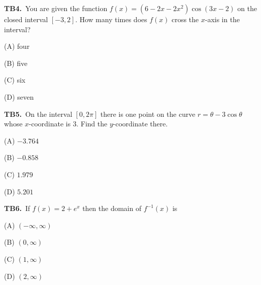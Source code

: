 \documentclass[11pt]{article}
\begin{document}
\bigskip\noindent\textbf{TB4.}\ You are given the function $f(x) = (6 - 2x - 2x^2)\cos(3x-2)$ on the closed interval $[-3,2]$. How many times does $f(x)$ cross the $x$-axis in the interval?
\begin{list}{}{\setlength{\leftmargin}{3em}\setlength{\labelwidth}{2.5em}\setlength{\itemsep}{0pt}\setlength{\topsep}{2pt}}
\item[(A)] four
\item[(B)] five
\item[(C)] six
\item[(D)] seven
\end{list}

\bigskip\noindent\textbf{TB5.}\ On the interval $[0,2\pi]$ there is one point on the curve $r = \theta - 3\cos\theta$ whose $x$-coordinate is $3$. Find the $y$-coordinate there.
\begin{list}{}{\setlength{\leftmargin}{3em}\setlength{\labelwidth}{2.5em}\setlength{\itemsep}{0pt}\setlength{\topsep}{2pt}}
\item[(A)] $-3.764$
\item[(B)] $-0.858$
\item[(C)] $1.979$
\item[(D)] $5.201$
\end{list}

\bigskip\noindent\textbf{TB6.}\ If $f(x) = 2 + e^x$ then the domain of $f^{-1}(x)$ is
\begin{list}{}{\setlength{\leftmargin}{3em}\setlength{\labelwidth}{2.5em}\setlength{\itemsep}{0pt}\setlength{\topsep}{2pt}}
\item[(A)] $(-\infty,\infty)$
\item[(B)] $(0,\infty)$
\item[(C)] $(1,\infty)$
\item[(D)] $(2,\infty)$
\end{list}
\end{document}
